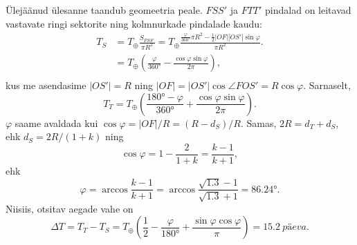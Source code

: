 Ülejäänud ülesanne taandub geomeetria peale. $FSS'$ ja $FTT'$ pindalad on leitavad vastavate ringi sektorite ning kolmnurkade pindalade kaudu:
\begin{align*}
	T_S &= T_\oplus \frac{S_{FSS'}}{\pi R^2} = T_\oplus \frac{\frac{\varphi}{\ang{360}}\pi R^2 - \frac 12|OF||OS'|\sin\varphi}{\pi R^2}.\\
	&= T_\oplus \left(\frac{\varphi}{\ang{360}} - \frac{\cos\varphi\sin\varphi}{2\pi}\right),\\
\end{align*}
kus me asendasime $|OS'| = R$ ning $|OF| = |OS'|\cos\angle FOS' = R\cos\varphi$. Sarnaselt,
\[
T_T = T_\oplus \left(\frac{\ang{180} - \varphi}{\ang{360}} + \frac{\cos\varphi\sin\varphi}{2\pi}\right).
\]
$\varphi$ saame avaldada kui $\cos\varphi = |OF| / R = (R - d_S) / R$. Samas, $2R = d_T + d_S$, ehk $d_S = 2R/(1 + k)$ ning 
\[
\cos\varphi = 1 - \frac{2}{1 + k} = \frac{k - 1}{k + 1},
\]
ehk
\[
\varphi = \arccos\frac{k - 1}{k + 1} = \arccos\frac{\sqrt{\num{1.3}} - 1}{\sqrt{\num{1.3}} + 1} = \ang{86.24}.
\]
Niisiis, otsitav aegade vahe on 
\[
\Delta T = T_T - T_S = T_\oplus \left(\frac{1}{2} - \frac{\varphi}{\ang{180}} + \frac{\sin\varphi\cos\varphi}{\pi}\right) = \SI{15.2}{päeva}.
\]
\probend